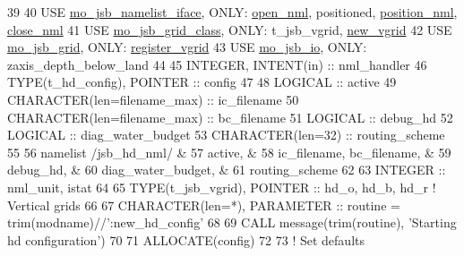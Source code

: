 \begin{DoxyCode}
39 
40     \textcolor{keywordtype}{USE }\hyperlink{namespacemo__jsb__namelist__iface}{mo\_jsb\_namelist\_iface}\textcolor{keywordtype}{, ONLY}: \hyperlink{namespacemo__jsb__namelist__iface_abb2821ffd4c30375faa307d522af3bcb}{open\_nml}, positioned, 
      \hyperlink{namespacemo__jsb__namelist__iface_a4d29dc192b429a0c5f11ecd7d7f637e9}{position\_nml}, \hyperlink{namespacemo__jsb__namelist__iface_a240047c255ab5bb3871ecdcdcd6d6a92}{close\_nml}
41     \textcolor{keywordtype}{USE }\hyperlink{namespacemo__jsb__grid__class}{mo\_jsb\_grid\_class}\textcolor{keywordtype}{,     ONLY}: t\_jsb\_vgrid, \hyperlink{namespacemo__jsb__grid__class_a9b97575796bec8269c7381e0ffedd2d8}{new\_vgrid}
42     \textcolor{keywordtype}{USE }\hyperlink{namespacemo__jsb__grid}{mo\_jsb\_grid}\textcolor{keywordtype}{,           ONLY}: \hyperlink{namespacemo__jsb__grid_a043909fe2d80d058e59831341f25fdab}{register\_vgrid}
43     \textcolor{keywordtype}{USE }\hyperlink{namespacemo__jsb__io}{mo\_jsb\_io}\textcolor{keywordtype}{,             ONLY}: zaxis\_depth\_below\_land
44 
45     \textcolor{keywordtype}{INTEGER},          \textcolor{keywordtype}{INTENT(in)} :: nml\_handler
46     \textcolor{keywordtype}{TYPE}(t\_hd\_config), \textcolor{keywordtype}{POINTER} :: config
47 
48     \textcolor{keywordtype}{LOGICAL}                       :: active
49     \textcolor{keywordtype}{CHARACTER(len=filename\_max)}   :: ic\_filename
50     \textcolor{keywordtype}{CHARACTER(len=filename\_max)}   :: bc\_filename
51     \textcolor{keywordtype}{LOGICAL}                       :: debug\_hd
52     \textcolor{keywordtype}{LOGICAL}                       :: diag\_water\_budget
53     \textcolor{keywordtype}{CHARACTER(len=32)}             :: routing\_scheme
55 
56     namelist /jsb\_hd\_nml/          &
57       active,                      &
58       ic\_filename, bc\_filename,    &
59       debug\_hd,                    &
60       diag\_water\_budget,           &
61       routing\_scheme
62 
63     \textcolor{keywordtype}{INTEGER} :: nml\_unit, istat
64 
65     \textcolor{keywordtype}{TYPE}(t\_jsb\_vgrid), \textcolor{keywordtype}{POINTER} :: hd\_o, hd\_b, hd\_r  \textcolor{comment}{! Vertical grids}
66 
67     \textcolor{keywordtype}{CHARACTER(len=*)}, \textcolor{keywordtype}{PARAMETER} :: routine = trim(modname)//\textcolor{stringliteral}{':new\_hd\_config'}
68 
69     \textcolor{keyword}{CALL }message(trim(routine), \textcolor{stringliteral}{'Starting hd configuration'})
70 
71     \textcolor{keyword}{ALLOCATE}(config)
72 
73     \textcolor{comment}{! Set defaults}

\end{DoxyCode}
